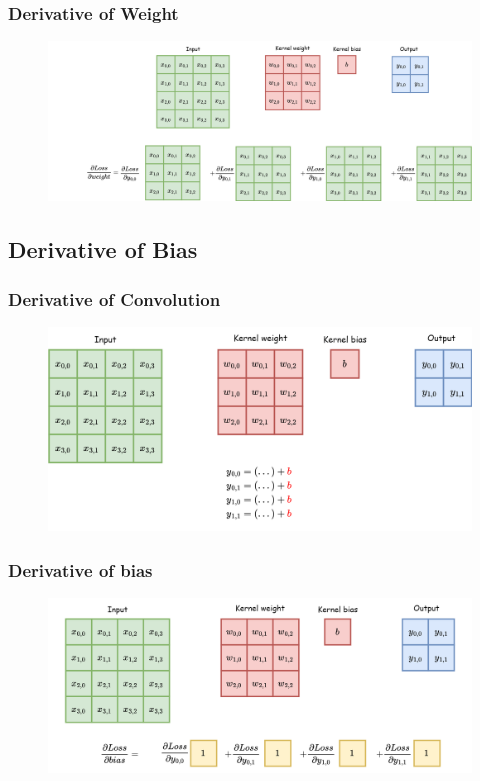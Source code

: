 \documentclass{beamer}
\begin{document}
    \begin{frame}
    	\frametitle{Derivative of Weight}
    	
\begin{figure}
	\includegraphics[width=1.\linewidth]{src/derivative.drawio}
\end{figure}
    \end{frame}
    
    \subsection{Derivative of Bias}
    
    
    \begin{frame}
    	\frametitle{Derivative of Convolution}
    	\begin{figure}
    		\includegraphics[width=1.\linewidth]{src/bias_grad.drawio (1)}
    	\end{figure}
    \end{frame}
    
    \begin{frame}
    	\frametitle{Derivative of bias}
    	
    	\begin{figure}
    		\includegraphics[width=1.\linewidth]{src/bias_grad.drawio}
    	\end{figure}
    \end{frame}
    
\end{document}

